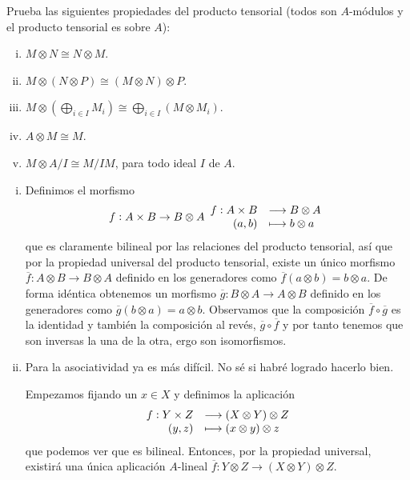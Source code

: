 \documentclass[../../../main.tex]{subfiles}
\begin{document}
\setcounter{exercici}{38}
\begin{exercici}
Prueba las siguientes propiedades del producto tensorial (todos son $A$-módulos y el producto tensorial es sobre $A$):
\begin{enumerate}[(i)]
    \item $M\otimes N\cong N\otimes M$.
    \item $M\otimes(N\otimes P)\cong (M\otimes N)\otimes P$.
    \item $M\otimes (\bigoplus_{i\in I}M_i)\cong \bigoplus_{i\in I}(M\otimes M_i)$.
    \item $A\otimes M\cong M$.
    \item $M\otimes A/I\cong M/IM$, para todo ideal $I$ de $A$.
\end{enumerate}
\end{exercici}
\begin{sol}
\begin{enumerate}[(i)]
    \item Definimos el morfismo
    \begin{equation}
        \notag
        f:A\times B\to B\otimes A
        \begin{array}{rl}
            f:A\times B & \longrightarrow B\otimes A \\
            (a,b) & \longmapsto b\otimes a
        \end{array}
    \end{equation}
    que es claramente bilineal por las relaciones del producto tensorial, así que por la propiedad universal del producto tensorial, existe un único morfismo $\overline{f}:A\otimes B\to B\otimes A$ definido en los generadores como $\overline{f}(a\otimes b)=b\otimes a$. De forma idéntica obtenemos un morfismo $\overline{g}:B\otimes A\to A\otimes B$ definido en los generadores como $\overline{g}(b\otimes a) = a\otimes b$. Observamos que la composición $\overline{f}\circ\overline{g}$ es la identidad y también la composición al revés, $\overline{g}\circ\overline{f}$ y por tanto tenemos que son inversas la una de la otra, ergo son isomorfismos. 
    
    \item Para la asociatividad ya es más difícil. No sé si habré logrado hacerlo bien.
    
    Empezamos fijando un $x\in X$ y definimos la aplicación 
    \begin{equation}
        \notag
        \begin{array}{rl}
            f:Y\times Z & \longrightarrow (X\otimes Y)\otimes Z \\
            (y,z) & \longmapsto (x\otimes y)\otimes z
        \end{array}
    \end{equation}
    que podemos ver que es bilineal. Entonces, por la propiedad universal, existirá una única aplicación $A$-lineal $\overline{f}:Y\otimes Z\to (X\otimes Y)\otimes Z$.
    

\end{enumerate}
\end{sol}
\end{document}
